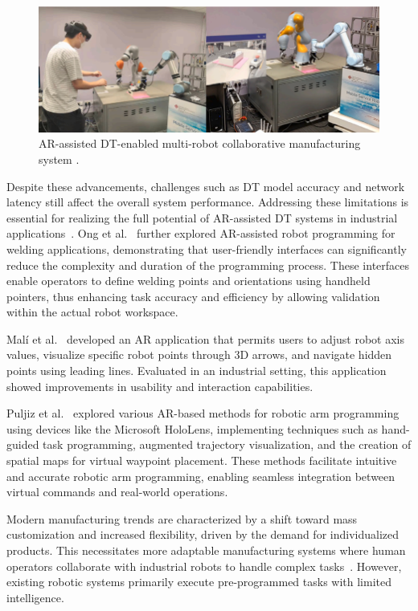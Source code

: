 \begin{figure}[!htpb]
    \centering
    \includegraphics[width=0.85\linewidth]{figs/physical-digital.png}
    \caption{\ac{AR}-assisted \ac{DT}-enabled multi-robot collaborative manufacturing system \cite{LI2022102321}.}
    \label{fig:physical-digital}
\end{figure}

Despite these advancements, challenges such as \ac{DT} model accuracy and network latency still affect the overall system performance. Addressing these limitations is essential for realizing the full potential of \ac{AR}-assisted \ac{DT} systems in industrial applications~\cite{LI2022102321}. Ong et al.~\cite{ong2020} further explored \ac{AR}-assisted robot programming for welding applications, demonstrating that user-friendly interfaces can significantly reduce the complexity and duration of the programming process. These interfaces enable operators to define welding points and orientations using handheld pointers, thus enhancing task accuracy and efficiency by allowing validation within the actual robot workspace.

Malí et al.~\cite{7819154} developed an \ac{AR} application that permits users to adjust robot axis values, visualize specific robot points through 3D arrows, and navigate hidden points using leading lines. Evaluated in an industrial setting, this application showed improvements in usability and interaction capabilities.

Puljiz et al.~\cite{puljiz2019conceptsendtoendaugmentedreality,puljiz2} explored various \ac{AR}-based methods for robotic arm programming using devices like the Microsoft HoloLens, implementing techniques such as hand-guided task programming, augmented trajectory visualization, and the creation of spatial maps for virtual waypoint placement. These methods facilitate intuitive and accurate robotic arm programming, enabling seamless integration between virtual commands and real-world operations.

Modern manufacturing trends are characterized by a shift toward mass customization and increased flexibility, driven by the demand for individualized products. This necessitates more adaptable manufacturing systems where human operators collaborate with industrial robots to handle complex tasks~\cite{1,2,3}. However, existing robotic systems primarily execute pre-programmed tasks with limited intelligence.

